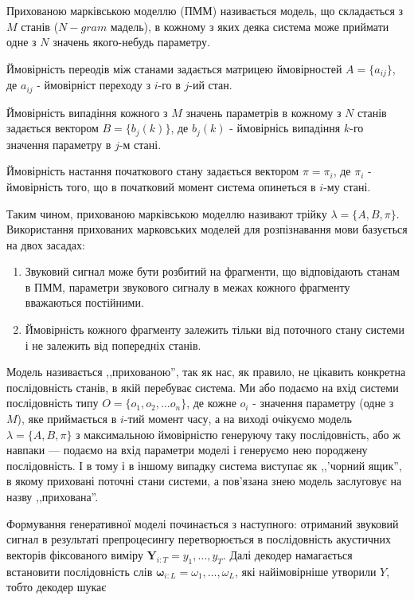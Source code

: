 \documentclass{diploma}
\begin{document}
Прихованою марківською моделлю (ПММ) називається модель, що складається з $M$ станів ($N-gram$ мадель), в кожному з яких деяка система може приймати одне з $N$ значень якого-небудь параметру.

Ймовірність переодів між станами задається матрицею ймовірностей $A=\{a_{ij}\}$, де $a_{ij}$ - ймовірніст переходу з $i$-го в $j$-ий стан. 

Ймовірність випадіння кожного з $M$ значень параметрів в кожному з $N$ станів задається вектором $B=\{b_j(k)\}$, де $b_j(k)$ - ймовірнісь випадіння $k$-го значення параметру в $j$-м стані.

Ймовірність настання початкового стану задається вектором $\pi = {\pi_i}$, де $\pi_i$ - ймовірність того, що в початковий момент система опинеться в $i$-му стані.

Таким чином, прихованою марківською моделлю називают трійку $\lambda = \{A,B,\pi\}$. Використання прихованих марковських моделей для розпізнавання мови базується на двох засадах:

\begin{enumerate}
\item Звуковий сигнал може бути розбитий на фрагменти, що відповідають станам в ПММ, параметри звукового сигналу в межах кожного фрагменту вважаються постійними.
\item Ймовірність кожного фрагменту залежить тільки від поточного стану системи і не залежить від попередніх станів.
\end{enumerate}

Модель називається ,,прихованою'', так як нас, як правило, не цікавить конкретна послідовність станів, в якій перебуває система. Ми або подаємо на вхід системи послідовність типу $O = \{o_1,o_2, \dots o_n\}$, де кожне $o_i$ - значення параметру (одне з $M$), яке приймається в $i$-тий момент часу, а на виході очікуємо модель $\lambda = \{A,B,\pi\}$ з максимальною ймовірністю генеруючу таку послідовність, або ж навпаки --- подаємо на вхід параметри моделі і генеруємо нею породжену послідовність. І в тому і в іншому випадку система виступає як ,,'чорний ящик'', в якому приховані поточні стани системи, а пов'язана знею модель заслуговує на назву ,,прихована''.


Формування генеративної моделі починається з наступного: отриманий звуковий сигнал в результаті препроцесингу перетворюється в послідовність акустичних векторів фіксованого виміру $\boldsymbol Y_{i:T} = y_1,\dots,y_T$. Далі декодер намагається встановити послідовність слів $\boldsymbol\omega_{i:L} = \omega_1,\dots,\omega_L$, які найімовірніше утворили $Y$, тобто декодер шукає
\end{document}
